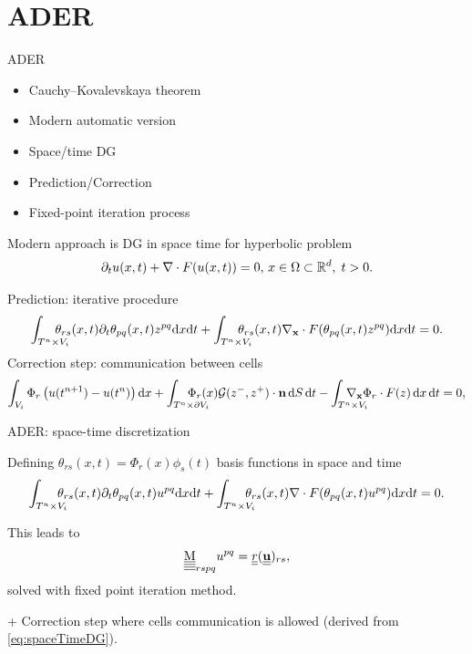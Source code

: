 \documentclass[9pt,compress,t,aspectratio=169]{beamer}
\begin{document}
\section{ADER}
\begin{frame}{ADER}
	\begin{minipage}{0.43\textwidth}
	\begin{itemize}
		\item Cauchy–Kovalevskaya theorem
		\item Modern  automatic version 
		\item Space/time DG
		\item Prediction/Correction
		\item Fixed-point iteration process
	\end{itemize}
\end{minipage}\hfill
\begin{minipage}{0.55\textwidth}
Modern approach is DG in space time for hyperbolic problem
\begin{equation}
	\label{eq:pde}
	\partial_t u(x,t) + \nabla \cdot F(u(x,t)) = 0, \,  x\in \Omega\subset \mathbb{R}^d,\; t>0.
\end{equation}
\end{minipage}

	Prediction: iterative procedure
	\begin{equation*}
		\int_{\STC}\!\!\!\!\!\!\!\! \theta_{rs}(x,t)\partial_t \theta_{pq}(x,t) z^{pq} \diff x \diff t+ \int_{\STC}\!\!\!\!\!\!\!\! \theta_{rs}(x,t) \nabla_{\mathbf{x}} \cdot F(\theta_{pq}(x,t) z^{pq})  \diff x \diff t=0.
	\end{equation*}
	Correction step: communication between cells
	\begin{equation*}
		\int_{\SC} \Phi_r\left( u(t^{n+1})-u(t^n) \right) \dd x + \int_{ \TC\times \partial \SC}\!\!\!\!\!\!\!\! \!\!\!\!\Phi_r(x) \mathcal{G}(z^{-},z^{+}) \cdot \boldsymbol{\mathrm{n}} \, \diff S\, \diff t - \int_{ \STC} \!\!\!\!\!\!\!\!\!\!\!\!\nabla_{\mathbf{x}} \Phi_r \cdot F(z) \, \diff x\, \diff t =0,
	\end{equation*}
	
\end{frame}

\begin{frame}{ADER: space-time discretization}

Defining $\theta_{rs}(x,t) =\Phi_r(x) \phi_s(t)$ basis functions in space and time
\begin{equation}
\int_{\STC}\!\!\!\!\!\! \theta_{rs}(x,t)\partial_t \theta_{pq}(x,t) u^{pq} \diff x \diff t+ \int_{\STC}\!\!\!\!\!\! \theta_{rs}(x,t) \nabla \cdot F(\theta_{pq}(x,t) u^{pq})  \diff x \diff t=0.\label{eq:spaceTimeDG}
\end{equation}
\pause

This leads to
\begin{equation}\label{eq:ADER_DG}
\underline{\underline{\underline{\underline{\mathrm{M}}}}}_{rspq} u^{pq} = \underline{\underline{r}}(\underline{\underline{\mathbf{u}}})_{rs},
\end{equation}
solved with fixed point iteration method.

 +  Correction step where cells communication is allowed (derived from \eqref{eq:spaceTimeDG}). 

\end{frame}
\end{document}
